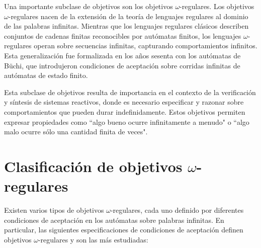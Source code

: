 Una importante subclase de objetivos son los objetivos $\omega$-regulares. Los
objetivos $\omega$-regulares nacen de la extensión de la teoría de lenguajes
regulares al dominio de las palabras infinitas. Mientras que los lenguajes
regulares clásicos describen conjuntos de cadenas finitas reconocibles por
autómatas finitos, los lenguajes $\omega$-regulares operan sobre secuencias
infinitas, capturando comportamientos infinitos. Esta generalización fue
formalizada en los años sesenta con los autómatas de Büchi, que introdujeron
condiciones de aceptación sobre corridas infinitas de autómatas de estado
finito.

Esta subclase de objetivos resulta de importancia en el contexto de la
verificación y síntesis de sistemas reactivos, donde es necesario especificar y
razonar sobre comportamientos que pueden durar indefinidamente. Estos objetivos
permiten expresar propiedades como ``algo bueno ocurre infinitamente a menudo"
o ``algo malo ocurre sólo una cantidad finita de veces".

\section{Clasificación de objetivos $\omega$-regulares}

Existen varios tipos de objetivos $\omega$-regulares, cada uno definido por
diferentes condiciones de aceptación en los autómatas sobre palabras infinitas.
En particular, las siguientes especificaciones de condiciones de aceptación
definen objetivos $\omega$-regulares y son las más estudiadas:

